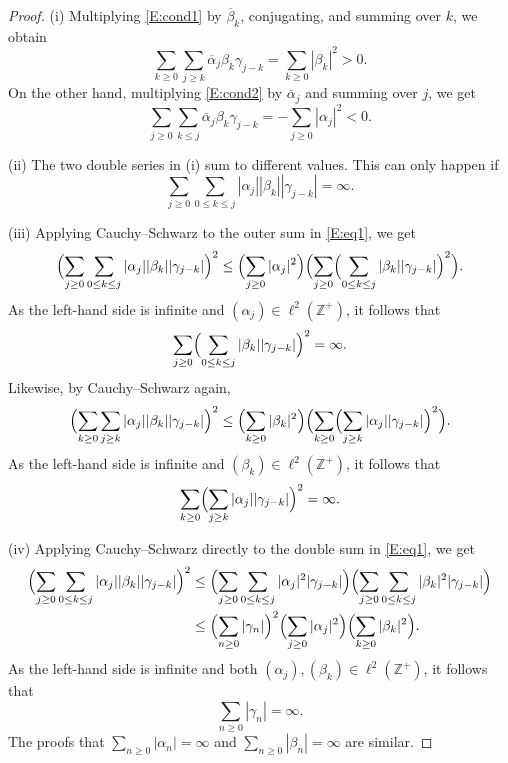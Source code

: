 \documentclass[11pt,reqno]{amsart}
\theoremstyle{plain}
\theoremstyle{definition}
\theoremstyle{remark}
\newcommand{\ZZ}{\mathbb{Z}}
\begin{document}
\begin{proof}
(i)  Multiplying  \eqref{E:cond1} by $\overline{\beta}_k$, conjugating, and summing over $k$, we obtain
\[
\sum_{k\ge0}\sum_{j\ge k}\overline{\alpha}_j\beta_k\gamma_{j-k}=\sum_{k\ge0}|\beta_k|^2>0.
\]
On the other hand, multiplying \eqref{E:cond2} by $\overline{\alpha}_j$ and summing over $j$, we get
\[
\sum_{j\ge0}\sum_{k\le j}\overline{\alpha}_j\beta_k\gamma_{j-k}=-\sum_{j\ge0}|\alpha_j|^2<0.
\]

(ii) The two double series in (i) sum to different values.
This can only happen if
\begin{equation}\label{E:eq1}
\sum_{j\ge0}\sum_{0\le k\le j}|\alpha_j||\beta_k||\gamma_{j-k}|=\infty.
\end{equation}

(iii)
Applying Cauchy--Schwarz to the outer sum in \eqref{E:eq1}, we get
\[
\Bigl(\sum_{j\ge0}\sum_{0\le k\le j}|\alpha_j||\beta_k||\gamma_{j-k}|\Bigr)^2
\le \Bigl(\sum_{j\ge0}|\alpha_j|^2\Bigr)\Bigl(\sum_{j\ge0}\Bigl(\sum_{0\le k\le j}|\beta_k||\gamma_{j-k}|\Bigr)^2\Bigr).
\]
As the left-hand side is infinite and $(\alpha_j)\in\ell^2(\ZZ^+)$, it follows that
\[
\sum_{j\ge0}\Bigl(\sum_{0\le k\le j}|\beta_k||\gamma_{j-k}|\Bigr)^2=\infty.
\]
Likewise, by Cauchy--Schwarz again,
\[
\Bigl(\sum_{k\ge0}\sum_{j\ge k}|\alpha_j||\beta_k||\gamma_{j-k}|\Bigr)^2
\le \Bigl(\sum_{k\ge0}|\beta_k|^2\Bigr)\Bigl(\sum_{k\ge0}\Bigl(\sum_{j\ge k}|\alpha_j||\gamma_{j-k}|\Bigr)^2\Bigr).
\]
As the left-hand side is infinite and $(\beta_k)\in\ell^2(\ZZ^+)$, it follows that
\begin{equation}\label{E:eq2}
\sum_{k\ge0}\Bigl(\sum_{j\ge k}|\alpha_j||\gamma_{j-k}|\Bigr)^2=\infty.
\end{equation}


(iv) Applying Cauchy--Schwarz directly to the double sum in \eqref{E:eq1}, we get
\begin{align*}
\Bigl(\sum_{j\ge0}\sum_{0\le k\le j}|\alpha_j||\beta_k||\gamma_{j-k}|\Bigr)^2
&\le\Bigl(\sum_{j\ge0}\sum_{0\le k\le j}|\alpha_j|^2|\gamma_{j-k}|\Bigr)\Bigl(\sum_{j\ge0}\sum_{0\le k\le j}|\beta_k|^2|\gamma_{j-k}|\Bigr)\\
&\le \Bigl(\sum_{n\ge0}|\gamma_n|\Bigr)^2\Bigl(\sum_{j\ge0}|\alpha_j|^2\Bigr)\Bigl(\sum_{k\ge0}|\beta_k|^2\Bigr).
\end{align*}
As the left-hand side is infinite and both $(\alpha_j),(\beta_k)\in\ell^2(\ZZ^+)$, it follows that
\[
\sum_{n\ge0}|\gamma_n|=\infty.
\]
The proofs that $\sum_{n\ge0}|\alpha_n|=\infty$ and $\sum_{n\ge0}|\beta_n|=\infty$ are similar.



\end{proof}
\end{document}
